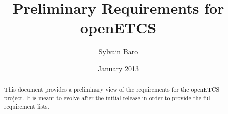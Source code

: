 \documentclass{template/openetcs_article}
\begin{document}
\frontmatter
{}







\title{Preliminary Requirements for openETCS}


\date{January 2013}


\author{Sylvain Baro}
  
  



\begin{abstract}
This document provides a preliminary view of the requirements for the openETCS project. 
It is meant to evolve after the initial release in order to provide the full requirement lists.
\end{abstract}

\maketitle
\tableofcontents
\listoffiguresandtables
\newpage



\newcommand{\tbd}{\colorbox{cyan}{\%\%To Be Defined\%\%}}
\newcommand{\tbc}{\colorbox{cyan}{\%\%To Be Confirmed\%\%}}
\newcommand{\todo}[1]{\colorbox{cyan}{\%\%{#1}\%\%}}
\newlength{\origindent}

\newenvironment{issue}{
	\begin{quote}
	\begin{itshape}Open Issue. 
}{
	\end{itshape}
	\end{quote}
}
\end{document}
